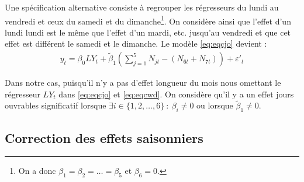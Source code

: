 \documentclass[11pt,french,french]{article}
\let\rmarkdownfootnote\footnote%
\def\footnote{\protect\rmarkdownfootnote}
\begin{document}
Une spécification alternative consiste à regrouper les régresseurs du lundi au vendredi et ceux du samedi et du dimanche\footnote{On a donc \(\beta_1=\beta_2=\dots=\beta_5\) et \(\beta_6 = 0\).}.
On considère ainsi que l'effet d'un lundi lundi est le même que l'effet d'un mardi, etc. jusqu'au vendredi et que cet effet est différent le samedi et le dimanche. Le modèle \eqref{eq:eqcjo} devient :
\begin{eqnarray}
y_t=\beta_0 LY_t + \tilde\beta_1 \left(\sum_{j=1}^{5}N_{jt} - (N_{6t} + N_{7t})\right) + \varepsilon'_t
\label{eq:eqcjowd}
\end{eqnarray}

Dans notre cas, puisqu'il n'y a pas d'effet longueur du mois nous omettant le régresseur \(LY_t\) dans \eqref{eq:eqcjo} et \eqref{eq:eqcwd}. On considère qu'il y a un effet jours ouvrables significatif lorsque \(\exists i\in \{1,2,\dots,6\}\::\:\beta_i\ne0\) ou lorsque \(\tilde\beta_1\ne0\).

\hypertarget{sec:cvs}{%
\subsection{Correction des effets saisonniers}\label{sec:cvs}}

\newpage

\nocite{*}
\end{document}
